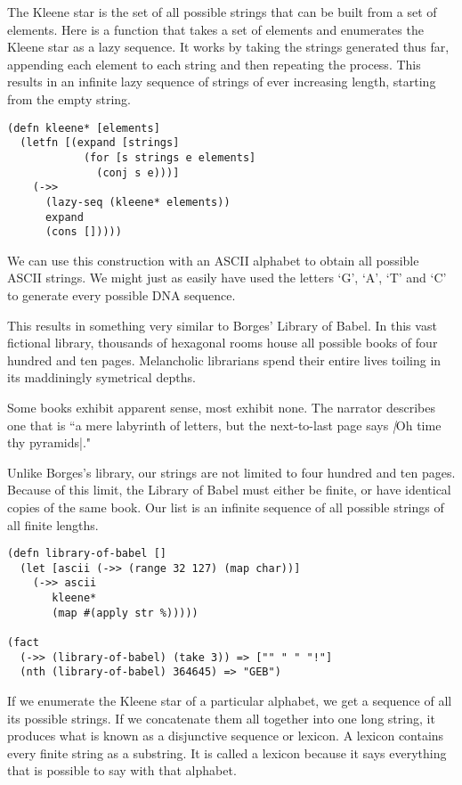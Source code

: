\documentclass[numbers]{sigplanconf}
\begin{document}
The Kleene star is the set of all possible strings that can be built from a set of elements. Here is a function that takes a set
of elements and enumerates the Kleene star as a lazy sequence. It works by taking the strings generated thus far, appending each
element to each string and then repeating the process. This results in an infinite lazy sequence of strings of ever increasing
length, starting from the empty string.

\begin{verbatim}
(defn kleene* [elements]
  (letfn [(expand [strings]
            (for [s strings e elements]
              (conj s e)))]
    (->>
      (lazy-seq (kleene* elements))
      expand
      (cons []))))
\end{verbatim}

We can use this construction with an ASCII alphabet to obtain all possible ASCII strings. We might just as easily have
used the letters `G', `A', `T' and `C' to generate every possible DNA sequence.

This results in something very similar to Borges' Library of Babel. In this vast fictional library, thousands of hexagonal
rooms house all possible books of four hundred and ten pages. Melancholic librarians spend their entire lives toiling in its
maddiningly symetrical depths.

Some books exhibit apparent sense, most exhibit none. The narrator describes one that is ``a mere labyrinth of letters,
but the next-to-last page says \textit|Oh time thy pyramids|."

Unlike Borges's library, our strings are not limited to four hundred and ten pages. Because of this limit, the Library of Babel
must either be finite, or have identical copies of the same book. Our list is an infinite sequence of all possible strings of
all finite lengths.

\begin{verbatim}
(defn library-of-babel []
  (let [ascii (->> (range 32 127) (map char))]
    (->> ascii
       kleene*
       (map #(apply str %)))))

(fact
  (->> (library-of-babel) (take 3)) => ["" " " "!"]
  (nth (library-of-babel) 364645) => "GEB")
\end{verbatim}

If we enumerate the Kleene star of a particular alphabet, we get a sequence of all its possible strings.
If we concatenate them all together into one long string, it produces what is known as a disjunctive sequence or lexicon.
A lexicon contains every finite string as a substring. It is called a lexicon because it says everything that is possible
to say with that alphabet.
\end{document}
